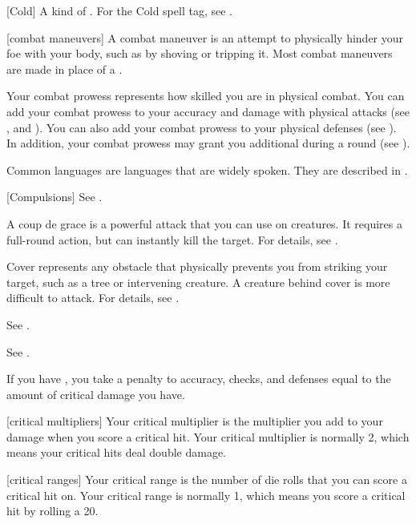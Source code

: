 [Cold] A kind of . For the Cold spell tag, see .

[combat maneuvers] A combat maneuver is an attempt to physically hinder your foe with your body, such as by shoving or tripping it.
Most combat maneuvers are made in place of a .

 Your combat prowess represents how skilled you are in physical combat.
You can add your combat prowess to your accuracy and damage with physical attacks (see , and ).
You can also add your combat prowess to your physical defenses (see ).
In addition, your combat prowess may grant you additional  during a round (see ).

 Common languages are languages that are widely spoken.
They are described in .

[Compulsions] See .

 A coup de grace is a powerful attack that you can use on \helpless creatures.
It requires a full-round action, but can instantly kill the target.
For details, see .

 Cover represents any obstacle that physically prevents you from striking your target, such as a tree or intervening creature. A creature behind cover is more difficult to attack.
For details, see .

 See .

 See .

 If you have , you take a penalty to accuracy, checks, and defenses equal to the amount of critical damage you have.

[critical multipliers] Your critical multiplier is the multiplier you add to your damage when you score a critical hit.
Your critical multiplier is normally 2, which means your critical hits deal double damage.

[critical ranges] Your critical range is the number of die rolls that you can score a critical hit on.
Your critical range is normally 1, which means you score a critical hit by rolling a 20.

